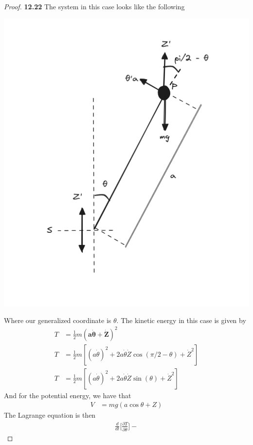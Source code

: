 \documentclass[11pt]{article}
\theoremstyle{definition}
\begin{document}
\begin{proof}{\textbf{12.22}}
    The system in this case looks like the following
    \begin{center}
        \includegraphics[scale=0.5]{ch12-22.png}
    \end{center}
    Where our generalized coordinate is $\theta$.
    The kinetic energy in this case is given by
    \begin{align*}
        T &= \frac{1}{2}m(\bm{a\dot{\theta}} + \bm{\dot Z})^2\\
        T &= \frac{1}{2}m[(a\dot{\theta})^2
        + 2a\dot{\theta}\dot{Z}\cos(\pi/2 - \theta) + \dot{Z}^2]\\
        T &= \frac{1}{2}m[(a\dot{\theta})^2
        + 2a\dot{\theta}\dot{Z}\sin(\theta) + \dot{Z}^2]
    \end{align*}
    And for the potential energy, we have that 
    \begin{align*}
        V &= mg(a\cos\theta + Z)
    \end{align*}
    The Lagrange equation is then
    \begin{align*}
        \frac{d}{dt}\bigg[\frac{\partial T}{\partial \dot{\theta}}\bigg] - 

\end{align*}
\end{proof}
\end{document}
